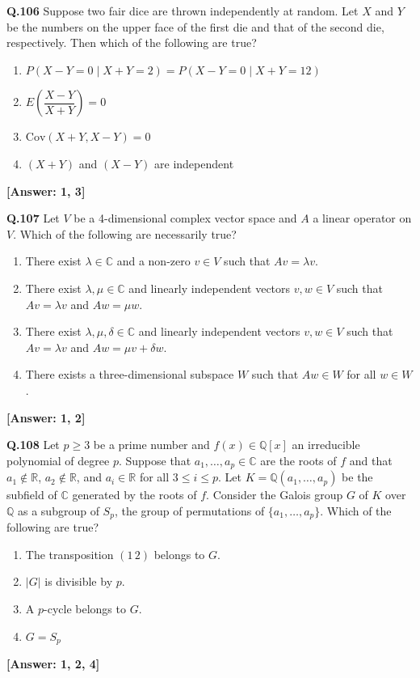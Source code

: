 \documentclass[12pt,a4paper]{article}
\newcommand{\ans}[1]{\quad\textcolor{anscolor}{\textbf{[Answer: #1]}}}
\begin{document}
\textbf{Q.106} Suppose two fair dice are thrown independently at random. Let $X$ and $Y$ be the numbers on the upper face of the first die and that of the second die, respectively. Then which of the following are true?
\begin{enumerate}[label=\arabic*.]
\item $P(X-Y=0\mid X+Y=2)=P(X-Y=0\mid X+Y=12)$
\item $E\!\left(\dfrac{X-Y}{X+Y}\right)=0$
\item $\text{Cov}(X+Y,X-Y)=0$
\item $(X+Y)$ and $(X-Y)$ are independent
\end{enumerate}\ans{1, 3}

\textbf{Q.107} Let $V$ be a 4-dimensional complex vector space and $A$ a linear operator on $V$. Which of the following are necessarily true?
\begin{enumerate}[label=\arabic*.]
\item There exist $\lambda\in\mathbb{C}$ and a non-zero $v\in V$ such that $Av=\lambda v$.
\item There exist $\lambda,\mu\in\mathbb{C}$ and linearly independent vectors $v,w\in V$ such that $Av=\lambda v$ and $Aw=\mu w$.
\item There exist $\lambda,\mu,\delta\in\mathbb{C}$ and linearly independent vectors $v,w\in V$ such that $Av=\lambda v$ and $Aw=\mu v+\delta w$.
\item There exists a three-dimensional subspace $W$ such that $Aw\in W$ for all $w\in W$.
\end{enumerate}\ans{1, 2}

\textbf{Q.108} Let $p\ge3$ be a prime number and $f(x)\in\mathbb{Q}[x]$ an irreducible polynomial of degree $p$. Suppose that $a_1,\ldots,a_p\in\mathbb{C}$ are the roots of $f$ and that $a_1\notin\mathbb{R}$, $a_2\notin\mathbb{R}$, and $a_i\in\mathbb{R}$ for all $3\le i\le p$. Let $K=\mathbb{Q}(a_1,\ldots,a_p)$ be the subfield of $\mathbb{C}$ generated by the roots of $f$. Consider the Galois group $G$ of $K$ over $\mathbb{Q}$ as a subgroup of $S_p$, the group of permutations of $\{a_1,\ldots,a_p\}$. Which of the following are true?
\begin{enumerate}[label=\arabic*.]
\item The transposition $(1\,2)$ belongs to $G$. \item $|G|$ is divisible by $p$.
\item A $p$-cycle belongs to $G$. \item $G=S_p$
\end{enumerate}\ans{1, 2, 4}
\end{document}
